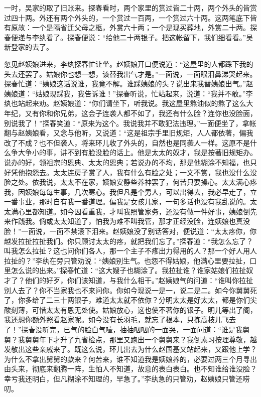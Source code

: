 \begin{parag}
    一时，吴家的取了旧账来。探春看时，两个家里的赏过皆二十两，两个外头的皆赏过四十两。外还有两个外头的，一个赏过一百两，一个赏过六十两。这两笔底下皆有原故：一个是隔省迁父母之柩，外赏六十两；一个是现买葬地，外赏二十两。探春便递与李纨看了。探春便说：“给他二十两银子。把这帐留下，我们细看看。”吴新登家的去了。
\end{parag}


\begin{parag}
    忽见赵姨娘进来，李纨探春忙让坐。赵姨娘开口便说道：“这屋里的人都踩下我的头去还罢了。姑娘你也想一想，该替我出气才是。”一面说，一面眼泪鼻涕哭起来。探春忙道：“姨娘这话说谁，我竟不解。谁踩姨娘的头？说出来我替姨娘出气。”赵姨娘道：“姑娘现踩我，我告诉谁！”探春听说，忙站起来，说道：“我并不敢。”李纨也站起来劝。赵姨娘道：“你们请坐下，听我说。我这屋里熬油似的熬了这么大年纪，又有你和你兄弟，这会子连袭人都不如了，我还有什么脸？连你也没脸面，别说我了！”探春笑道：“原来为这个。我说我并不敢犯法违理。”一面便坐了，拿帐翻与赵姨娘看，又念与他听，又说道：“这是祖宗手里旧规矩，人人都依著，偏我改了不成？也不但袭人，将来环儿收了外头的，自然也是同袭人一样。这原不是什么争大争小的事，讲不到有脸没脸的话上。他是太太的奴才，我是按著旧规矩办。说办的好，领祖宗的恩典、太太的恩典；若说办的不均，那是他糊涂不知福，也只好凭他抱怨去。太太连房子赏了人，我有什么有脸之处；一文不赏，我也没什么没脸之处。依我说，太太不在家，姨娘安静些养神罢了，何苦只要操心。太太满心疼我，因姨娘每每生事，几次寒心。我但凡是个男人，可以出得去，我必早走了，立一番事业，那时自有我一番道理。偏我是女孩儿家，一句多话也没有我乱说的。太太满心里都知道。如今因看重我，才叫我照管家务，还没有做一件好事，姨娘倒先来作践我。倘或太太知道了，怕我为难不叫我管，那才正经没脸，连姨娘也真没脸！”一面说，一面不禁滚下泪来。赵姨娘没了别话答对，便说道：“太太疼你，你越发拉扯拉扯我们。你只顾讨太太的疼，就把我们忘了。”探春道：“我怎么忘了？叫我怎么拉扯？这也问你们各人，那一个主子不疼出力得用的人？那一个好人用人拉扯的？”李纨在旁只管劝说：“姨娘别生气。也怨不得姑娘，他满心里要拉扯，口里怎么说的出来。”探春忙道：“这大嫂子也糊涂了。我拉扯谁？谁家姑娘们拉扯奴才了？他们的好歹，你们该知道，与我什么相干。”赵姨娘气的问道：“谁叫你拉扯别人去了？你不当家我也不来问你。你如今现说一是一，说二是二。如今你舅舅死了，你多给了二三十两银子，难道太太就不依你？分明太太是好太太，都是你们尖酸刻薄，可惜太太有恩无处使。姑娘放心，这也使不著你的银子。明儿等出了阁，我还想你额外照看赵家呢。如今没有长羽毛，就忘了根本，只拣高枝儿飞去了！”探春没听完，已气的脸白气噎，抽抽咽咽的一面哭，一面问道：“谁是我舅舅？我舅舅年下才升了九省检点，那里又跑出一个舅舅来？我倒素习按理尊敬，越发敬出这些亲戚来了。既这么说，环儿出去为什么赵国基又站起来，又跟他上学？为什么不拿出舅舅的款来？何苦来，谁不知道我是姨娘养的，必要过两三个月寻出由头来，彻底来翻腾一阵，生怕人不知道，故意的表白表白。也不知谁给谁没脸？幸亏我还明白，但凡糊涂不知理的，早急了。”李纨急的只管劝，赵姨娘只管还唠叨。
\end{parag}


